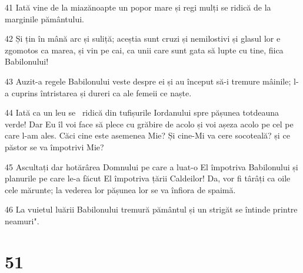 \par 41 Iată vine de la miazănoapte un popor mare și regi mulți se ridică de la marginile pământului.
\par 42 Și țin în mână arc și suliță; aceștia sunt cruzi și nemilostivi și glasul lor e zgomotos ca marea, și vin pe cai, ca unii care sunt gata să lupte cu tine, fiica Babilonului!
\par 43 Auzit-a regele Babilonului veste despre ei și au început să-i tremure mâinile; l-a cuprins întristarea și dureri ca ale femeii ce naște.
\par 44 Iată ca un leu se  ridică din tufișurile Iordanului spre pășunea totdeauna verde! Dar Eu îl voi face să plece cu grăbire de acolo și voi așeza acolo pe cel pe care l-am ales. Căci cine este asemenea Mie? Și cine-Mi va cere socoteală? și ce păstor se va împotrivi Mie?
\par 45 Ascultați dar hotărârea Domnului pe care a luat-o El împotriva Babilonului și planurile pe care le-a făcut El împotriva țării Caldeilor! Da, vor fi târâți ca oile cele mărunte; la vederea lor pășunea lor se va înfiora de spaimă.
\par 46 La vuietul luării Babilonului tremură pământul și un strigăt se întinde printre neamuri".

\chapter{51}

